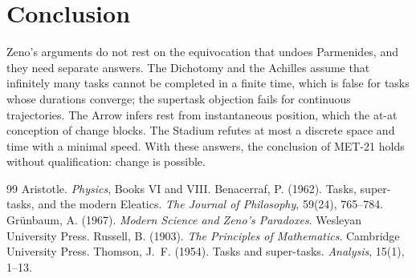 \documentclass{situationist-preprint}
\begin{document}
\section{Conclusion}

Zeno's arguments do not rest on the equivocation that undoes Parmenides, and they need separate answers. The Dichotomy and the Achilles assume that infinitely many tasks cannot be completed in a finite time, which is false for tasks whose durations converge; the supertask objection fails for continuous trajectories. The Arrow infers rest from instantaneous position, which the at-at conception of change blocks. The Stadium refutes at most a discrete space and time with a minimal speed. With these answers, the conclusion of MET-21 holds without qualification: change is possible.

\begin{thebibliography}{99}\small
{} Aristotle. \emph{Physics}, Books VI and VIII.
 Benacerraf, P. (1962). Tasks, super-tasks, and the modern Eleatics. \emph{The Journal of Philosophy}, 59(24), 765--784.
 Gr\"unbaum, A. (1967). \emph{Modern Science and Zeno's Paradoxes}. Wesleyan University Press.
 Russell, B. (1903). \emph{The Principles of Mathematics}. Cambridge University Press.
 Thomson, J.~F. (1954). Tasks and super-tasks. \emph{Analysis}, 15(1), 1--13.
\end{thebibliography}
\end{document}
